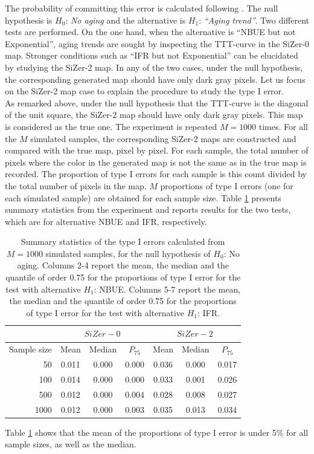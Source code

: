 \documentclass[preprint,12pt]{elsarticle}
\begin{document}
The probability of committing this error is calculated following \cite{RMP07}. The null hypothesis is $H_0$: \textit{No aging} and the  alternative is  $H_1$: \textit{``Aging trend''}. Two different tests are performed. On the one hand, when the alternative is ``NBUE but not Exponential'', aging trends are sought by inspecting the TTT-curve in the SiZer-0 map. 
Stronger conditions such as ``IFR but not Exponential'' can be elucidated by studying the SiZer-2 map. In any of the two cases, under the null hypothesis, the corresponding generated map should have only dark gray pixels.  Let us focus on the SiZer-2 map case to explain the procedure to study the type I error.\\
 
As remarked above, under the null hypothesis that the TTT-curve is the diagonal of the unit square, the SiZer-2 map  should have only dark gray pixels. This map is considered as the true one. The experiment is repeated $M=1000$ times.  For all the $M$ simulated samples, the corresponding SiZer-2 maps are constructed  and compared with the true map, pixel by pixel. For each sample,  the total number of pixels where the color in the generated map is not the same as in the true map is recorded. The proportion of type I errors for each sample is this count divided by the total number of pixels in the map.  $M$ proportions of type I errors (one for each simulated sample) are obtained for each sample size. Table \ref{Tab:errorI} presents summary statistics from the experiment and reports results for the two tests, which are for alternative NBUE and IFR, respectively. 


\begin{table}[htb]
\centering
\caption{Summary statistics of the type I errors calculated from $M=1000$ simulated samples, for the null hypothesis of $ H_0$: No aging. Columns 2-4 report the mean, the median and the quantile of order 0.75 for the proportions of type I error for the test with alternative $H_1$: NBUE.  Columns 5-7 report the mean, the median and the quantile of order 0.75 for the proportions of type I error for the test with alternative $H_1$: IFR.}
{\begin{tabular}{r|ccc|ccc}\hline
               & \multicolumn{3}{|c|}{$SiZer-0$}& \multicolumn{3}{c}{$SiZer-2$} \\ \hline
   Sample size & Mean &   Median & $P_{75}$ &  Mean &   Median & $P_{75}$  \\ \hline
       50      &  0.011 &0.000 &0.000 &   0.036 & 0.000 & 0.017  \\
      100      &  0.014 &0.000 &0.000 &   0.033 & 0.001 & 0.026  \\
     500       &  0.012 &0.000 &0.004 &   0.028 & 0.008 & 0.027 \\
     1000      &  0.012 &0.000 &0.003 &   0.035 & 0.013 & 0.034 \\ \hline
\end{tabular}}
\label{Tab:errorI}
\end{table}
 Table \ref{Tab:errorI}  shows that the mean of the proportions of type  I error is under 5\% for all sample sizes, as well as the median.
\end{document}

